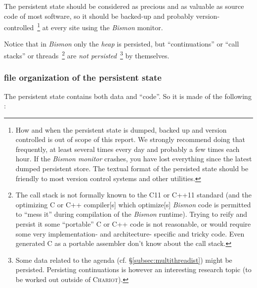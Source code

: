 The persistent state should be considered as precious and as valuable
as source code of most software, so it should be backed-up and
probably version-controlled~\footnote{How and when the persistent
  state is dumped, backed up and version controlled is out of scope of
  this report. We strongly recommend doing that frequently, at least
  several times every day and probably a few times each hour. If the
  \textit{Bismon monitor} crashes, you have lost everything since the
  latest dumped persistent store. The textual format of the persisted
  state should be friendly to most version control systems and other
  utilities.} at every site using the \emph{Bismon} monitor.

Notice that in \emph{Bismon} only the \emph{heap} is persisted, but
``continuations'' or ``call stacks'' or threads~\footnote{The call
  stack is not formally known to the C11 or C++11 standard (and the
  optimizing C or C++ compiler[s] which optimize[s] \emph{Bismon} code
  is permitted to ``mess it'' during compilation of the \emph{Bismon}
  runtime). Trying to reify and persist it some ``portable'' C or C++
  code is not reasonable, or would require some very implementation-
  and architecture- specific and tricky code. Even generated C as a
  portable assembler don't know about the call stack.}  are \emph{not
  persisted}~\footnote{Some data related to the agenda
  (cf. §\ref{subsec:multithreadist}) might be persisted. Persisting
  continuations is however an interesting research topic (to be
  worked out outside of \textsc{Chariot}).} by themselves.

\subsubsection{file organization of the persistent state}
\label{subsubsec:filestate}

The persistent state contains both data and ``code''. So it is made of the following :

